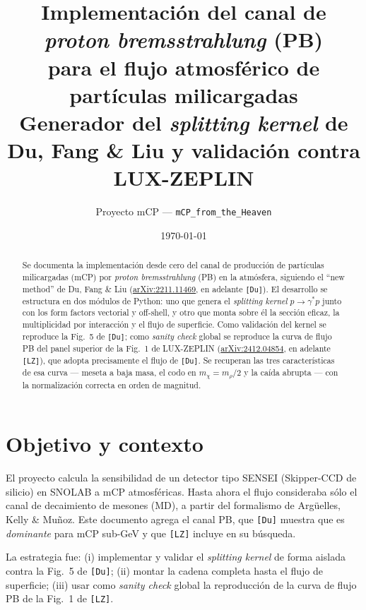 \documentclass[11pt,a4paper]{article}
\title{\textbf{Implementaci\'on del canal de \emph{proton bremsstrahlung} (PB)\\
para el flujo atmosf\'erico de part\'iculas milicargadas}\\[4pt]
\large Generador del \emph{splitting kernel} de Du, Fang \& Liu y validaci\'on
contra LUX-ZEPLIN}
\author{Proyecto mCP --- \texttt{mCP\_from\_the\_Heaven}}
\date{\today}
\newcommand{\mchi}{m_\chi}
\newcommand{\gammastar}{\gamma^\ast}
\newcommand{\Du}{\texttt{[Du]}}
\newcommand{\LZ}{\texttt{[LZ]}}
\begin{document}
\maketitle

\begin{abstract}
Se documenta la implementaci\'on desde cero del canal de producci\'on de
part\'iculas milicargadas (mCP) por \emph{proton bremsstrahlung} (PB) en la
atm\'osfera, siguiendo el ``new method'' de Du, Fang \& Liu
(\href{https://arxiv.org/abs/2211.11469}{arXiv:2211.11469}, en adelante \Du).
El desarrollo se estructura en dos m\'odulos de Python: uno que genera el
\emph{splitting kernel} $p\to\gammastar p$ junto con los form factors
vectorial y off-shell, y otro que monta sobre \'el la secci\'on eficaz, la
multiplicidad por interacci\'on y el flujo de superficie. Como validaci\'on
del kernel se reproduce la Fig.~5 de \Du; como \emph{sanity check} global se
reproduce la curva de flujo PB del panel superior de la Fig.~1 de LUX-ZEPLIN
(\href{https://arxiv.org/abs/2412.04854}{arXiv:2412.04854}, en adelante \LZ),
que adopta precisamente el flujo de \Du. Se recuperan las tres
caracter\'isticas de esa curva --- meseta a baja masa, el codo en
$\mchi=m_\rho/2$ y la ca\'ida abrupta --- con la normalizaci\'on correcta en
orden de magnitud.
\end{abstract}

\tableofcontents

\section{Objetivo y contexto}

El proyecto calcula la sensibilidad de un detector tipo SENSEI (Skipper-CCD
de silicio) en SNOLAB a mCP atmosf\'ericas. Hasta ahora el flujo consideraba
s\'olo el canal de decaimiento de mesones (MD), a partir del formalismo de
Arg\"uelles, Kelly \& Mu\~noz. Este documento agrega el canal PB, que \Du{}
muestra que es \emph{dominante} para mCP sub-GeV y que \LZ{} incluye en su
b\'usqueda.

La estrategia fue: (i) implementar y validar el \emph{splitting kernel} de
forma aislada contra la Fig.~5 de \Du; (ii) montar la cadena completa hasta
el flujo de superficie; (iii) usar como \emph{sanity check} global la
reproducci\'on de la curva de flujo PB de la Fig.~1 de \LZ.

\end{document}
